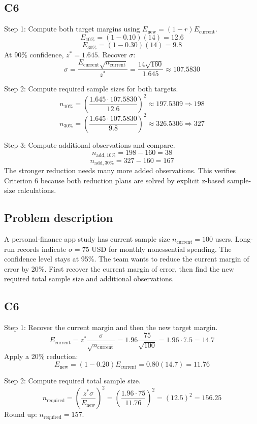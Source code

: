 \begin{ExamProblems}
		\subsection*{C6}
		Step 1: Compute both target margins using $E_{\text{new}}=(1-r)E_{\text{current}}$.
		\[
		E_{10\%} = (1-0.10)(14) = 12.6
		\]
		\[
		E_{30\%} = (1-0.30)(14) = 9.8
		\]
		At 90\% confidence, $z^* = 1.645$. Recover $\sigma$:
		\[
		\sigma = \frac{E_{\text{current}}\sqrt{n_{\text{current}}}}{z^*}
		= \frac{14\sqrt{160}}{1.645}
		\approx 107.5830
		\]

		Step 2: Compute required sample sizes for both targets.
		\[
		n_{10\%} = \left(\frac{1.645 \cdot 107.5830}{12.6}\right)^2
		\approx 197.5309 \Rightarrow 198
		\]
		\[
		n_{30\%} = \left(\frac{1.645 \cdot 107.5830}{9.8}\right)^2
		\approx 326.5306 \Rightarrow 327
		\]

		Step 3: Compute additional observations and compare.
		\[
		n_{\text{add},10\%} = 198 - 160 = 38
		\]
		\[
		n_{\text{add},30\%} = 327 - 160 = 167
		\]
		The stronger reduction needs many more added observations. This verifies Criterion 6 because both reduction plans are solved by explicit z-based sample-size calculations.

		\item
		\subsection*{Problem description}
		A personal-finance app study has current sample size $n_{\text{current}} = 100$ users. Long-run records indicate $\sigma = 75$ USD for monthly nonessential spending. The confidence level stays at 95\%. The team wants to reduce the current margin of error by 20\%. First recover the current margin of error, then find the new required total sample size and additional observations.

		\subsection*{C6}
		Step 1: Recover the current margin and then the new target margin.
		\[
		E_{\text{current}} = z^*\frac{\sigma}{\sqrt{n_{\text{current}}}}
		= 1.96\frac{75}{\sqrt{100}}
		= 1.96\cdot 7.5
		= 14.7
		\]
		Apply a 20\% reduction:
		\[
		E_{\text{new}} = (1-0.20)E_{\text{current}} = 0.80(14.7) = 11.76
		\]

		Step 2: Compute required total sample size.
		\[
		n_{\text{required}} = \left(\frac{z^*\sigma}{E_{\text{new}}}\right)^2
		= \left(\frac{1.96\cdot 75}{11.76}\right)^2
		= \left(12.5\right)^2
		= 156.25
		\]
		Round up: $n_{\text{required}} = 157$.


\end{ExamProblems}

